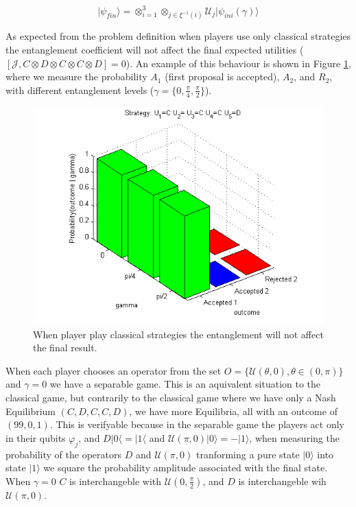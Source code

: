 \documentclass[10pt,twocolumn]{llncs}
\begin{document}
\begin{equation}
\vert\psi_{fin}\rangle=\otimes_{i=1}^{3}\otimes_{j\in\xi^{-1}(i)}\mathcal{U}_{j}\vert\psi_{ini}(\gamma)\rangle
\label{eq:piratas_final_move_23}
\end{equation} 

As expected from the problem definition when players use only classical strategies the entanglement coefficient will not affect the final expected utilities ($[ \mathcal{J} , C \otimes D \otimes C \otimes C \otimes D ] = 0 $).
An example of this behaviour is shown in Figure \ref{fig:pg_3players_99_0_1}, where we measure the probability $A_{1}$ (first proposal is accepted), $A_{2}$, and $R_{2}$, with different entanglement levels ($\gamma= \{ 0 , \frac{ \pi}{4}, \frac{\pi}{2} \} $).

\begin{figure}[h!]
\centering 
\includegraphics[scale=0.80]{Figures/1.5qubit/CDCCD.png}
\caption{When player play classical strategies the entanglement will not affect the final result. }
\label{fig:pg_3players_99_0_1}
\end{figure}

When each player chooses an operator from the set $O = \{ \mathcal{U} ( \theta , 0) , \theta \in (0, \pi) \}$ and $\gamma=0$ we have a separable game. This is an aquivalent situation to the classical game, but contrarily to the classical game where we have only a Nash Equilibrium $(C,D,C,C,D)$, we have more Equilibria, all with an outcome of $(99, 0, 1)$. This is verifyable because in the separable game the players act only in their qubits $\varphi_{j}$, and $D\vert 0\langle =\vert 1 \langle$ and $\mathcal{U}( \pi, 0) \vert 0 \rangle = - \vert 1 \rangle $, when measuring the probability of the operators $D$ and $\mathcal{U}( \pi, 0)$ tranforming a pure state $\vert 0 \rangle$ into state $\vert 1 \rangle$ we square the probability amplitude associated with the final state. When $\gamma = 0$  $C$ is interchangeble with $\mathcal{U}(0, \frac{\pi}{2})$, and $D$ is interchangeble wih $\mathcal{U}( \pi, 0)$.
\end{document}
